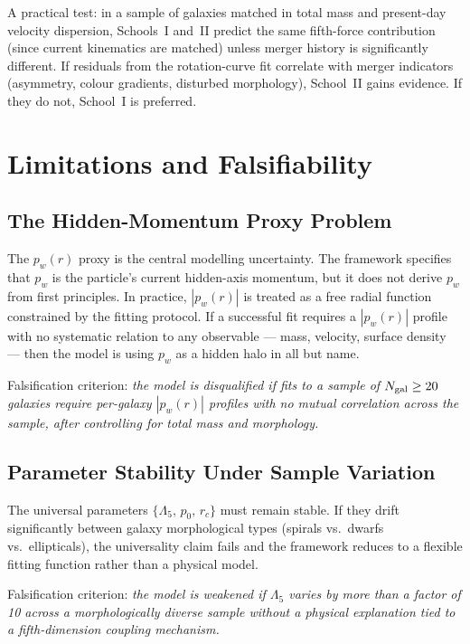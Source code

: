 \documentclass[11pt,a4paper]{article}
\newcommand{\pw}{p_w}                        %
\newcommand{\Lf}{\Lambda_5}                  %
\begin{document}
A practical test: in a sample of galaxies matched in total mass and present-day
velocity dispersion, Schools~I and~II predict the same fifth-force contribution
(since current kinematics are matched) unless merger history is significantly
different.  If residuals from the rotation-curve fit correlate with merger
indicators (asymmetry, colour gradients, disturbed morphology), School~II
gains evidence.  If they do not, School~I is preferred.

\section{Limitations and Falsifiability}\label{sec:limits}

\subsection{The Hidden-Momentum Proxy Problem}

The $\pw(r)$ proxy is the central modelling uncertainty.  The framework
specifies that $\pw$ is the particle's current hidden-axis momentum, but it
does not derive $\pw$ from first principles.  In practice, $|\pw(r)|$ is
treated as a free radial function constrained by the fitting protocol.  If
a successful fit requires a $|\pw(r)|$ profile with no systematic relation to
any observable --- mass, velocity, surface density --- then the model is using
$\pw$ as a hidden halo in all but name.

Falsification criterion: \emph{the model is disqualified if fits to a sample
of $N_{\rm gal} \geq 20$ galaxies require per-galaxy $|\pw(r)|$ profiles with
no mutual correlation across the sample, after controlling for total mass and
morphology.}

\subsection{Parameter Stability Under Sample Variation}

The universal parameters $\{\Lf,\,p_0,\,r_c\}$ must remain stable.  If
they drift significantly between galaxy morphological types (spirals vs.\
dwarfs vs.\ ellipticals), the universality claim fails and the framework
reduces to a flexible fitting function rather than a physical model.

Falsification criterion: \emph{the model is weakened if $\Lf$ varies by
more than a factor of 10 across a morphologically diverse sample without
a physical explanation tied to a fifth-dimension coupling mechanism.}
\end{document}
